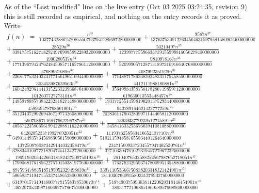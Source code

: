 \documentclass[11pt,a4paper]{article}
\theoremstyle{plain}
\theoremstyle{definition}
\begin{document}
As of the ``Last modified'' line on the live entry (Oct 03 2025 03:24:35, revision 9) this is still
recorded as empirical, and nothing on the entry records it as proved. Write
\begin{multline*}
f(n)\;=\;\frac{n^{38}}{1037743288624208555079379412896972800000000} + \frac{9587 n^{37}}{13763753091226345046315979581580902400000000} \\
+ \frac{28529 n^{36}}{33817575162718292497090858922803200000000} + \frac{50210497 n^{35}}{123997775596633739155999816050278400000000} \\
+ \frac{1900280537 n^{34}}{17713967942376248450857116578611200000000} + \frac{9810978167 n^{33}}{520999057128713189731091664076800000000} \\
+ \frac{57089921089 n^{32}}{23681775324032417715049621094400000000} + \frac{4087992351929 n^{31}}{17148871786368302483311794585600000000} \\
+ \frac{303453087639563 n^{30}}{16042492961441315226323936870400000000} + \frac{4412111988180881 n^{29}}{3564998435875847828071985971200000000} \\
+ \frac{1012607727773101 n^{28}}{14859788857383223231827148800000000} + \frac{619636013553448457 n^{27}}{193177255145981902013752934400000000} \\
+ \frac{458949578768601001 n^{26}}{3512313729926943672977326080000000} + \frac{943289164621422777259 n^{25}}{202836117903280997114440581120000000} \\
+ \frac{59070867116817962298787 n^{24}}{405672235806561994228881162240000000} + \frac{1393933770239512745891 n^{23}}{345841633253676039410810880000000} \\
+ \frac{64202052337199276920051 n^{22}}{649014493573456983050158080000000} + \frac{11193762585634106524077107 n^{21}}{5192115948587655864401264640000000} \\
+ \frac{1372508760873429144032358479 n^{20}}{32883401007721820474541342720000000} + \frac{234715009337204557947402530761 n^{19}}{327103304761022319457279672320000000} \\
+ \frac{196919620544266318182437509750193 n^{18}}{17990681761856227570150381977600000000} + \frac{26104076532588252567987652718051 n^{17}}{176379232959374780099513548800000000} \\
+ \frac{897593478835185195052329498839 n^{16}}{506583711047155337448652800000000} + \frac{339711053666750838203318321424907 n^{15}}{18110367669935803313789337600000000} \\
+ \frac{6349701573494460077791558378539673 n^{14}}{36220735339871606627578675200000000} + \frac{548749037509303811220820318146454901 n^{13}}{380317721068651869589576089600000000} \\

\end{multline*}
\end{document}
